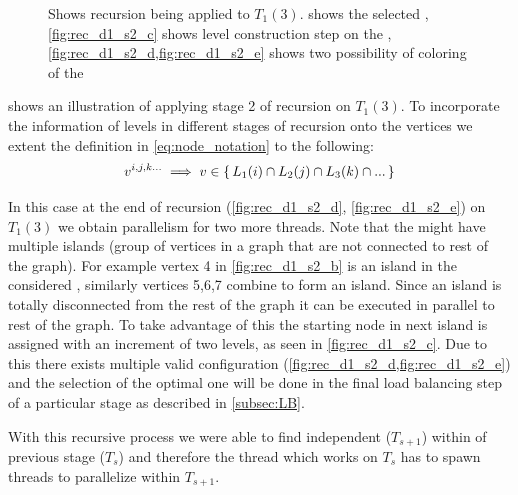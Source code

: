 \begin{figure}[thbp]
     	\caption{Shows recursion being applied to $T_1(3)$.  shows the selected \subgraph, \cref{fig:rec_d1_s2_c} shows level construction step on the \subgraph, \cref{fig:rec_d1_s2_d,fig:rec_d1_s2_e} shows two possibility of \DONE coloring of the \subgraph}
     	
     	\label{fig:rec_d1_s2}
     \end{figure}
     
      shows an illustration of applying stage 2 of recursion on $T_1(3)$. To incorporate the information of levels in different stages of recursion onto the vertices we extent the definition in \cref{eq:node_notation} to the following:
	 \begin{equation}
	    v^{i,j,k...} \implies v \in \set{L_1(i) \cap L_2(j) \cap L_3(k) \cap ...} 
	 \end{equation}
	 
     In this case at the end of recursion (\cf \cref{fig:rec_d1_s2_d}, \cref{fig:rec_d1_s2_e}) on $T_1(3)$ we obtain parallelism for two more threads. Note that the \subgraphs might have multiple islands (group of vertices in a graph that are not connected to rest of the graph). For example vertex 4 in \cref{fig:rec_d1_s2_b} is an island in the considered \subgraph, similarly vertices 5,6,7 combine to form an island. Since an island is totally disconnected from the rest of the graph it can be executed in parallel to rest of the graph. To take advantage of this the starting node in next island is assigned with an increment of two levels, as seen in \cref{fig:rec_d1_s2_c}. Due to this there exists multiple valid \DONE configuration (\cf \cref{fig:rec_d1_s2_d,fig:rec_d1_s2_e}) and the selection of the optimal one will be done in the final load balancing step of a particular stage as described in \cref{subsec:LB}.    
     
     With this recursive process we were able to find independent \levelGroups ($T_{s+1}$) within \levelGroup of previous stage ($T_s$) and therefore the thread which works on $T_s$ has to spawn threads to parallelize within $T_{s+1}$.
     
